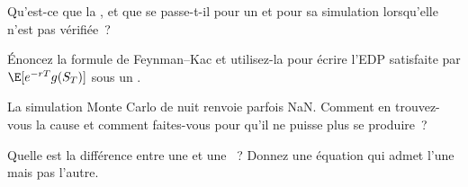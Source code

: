 \begin{interviewq}\label{iq:qm:stochastic-differential-equations:3}
Qu'est-ce que la , et que se passe-t-il pour un  et pour sa simulation
lorsqu'elle n'est pas vérifiée~?
\end{interviewq}

\begin{interviewq}\label{iq:qm:stochastic-differential-equations:4}
Énoncez la formule de Feynman--Kac et utilisez-la pour écrire l'EDP satisfaite par $\E[e^{-rT}g(S_T)]$ sous
un .
\end{interviewq}

\begin{interviewq}\label{iq:qm:stochastic-differential-equations:5}
La simulation Monte Carlo de nuit renvoie parfois NaN. Comment en trouvez-vous la cause et
comment faites-vous pour qu'il ne puisse plus se produire~?
\end{interviewq}

\begin{interviewq}\label{iq:qm:stochastic-differential-equations:6}
Quelle est la différence entre une  et une ~? Donnez une équation qui admet l'une
mais pas l'autre.
\end{interviewq}
